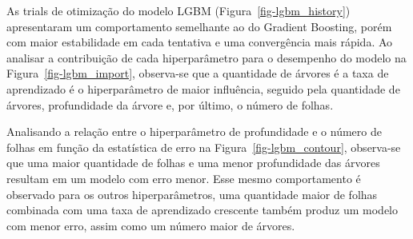 \documentclass[
  12pt,
  a4paper,
]{scrreprt}
\begin{document}
\vspace{12pt}

As trials de otimização do modelo LGBM (Figura~\ref{fig-lgbm_history})
apresentaram um comportamento semelhante ao do Gradient Boosting, porém
com maior estabilidade em cada tentativa e uma convergência mais rápida.
Ao analisar a contribuição de cada hiperparâmetro para o desempenho do
modelo na Figura~\ref{fig-lgbm_import}, observa-se que a quantidade de
árvores é a taxa de aprendizado é o hiperparâmetro de maior influência,
seguido pela quantidade de árvores, profundidade da árvore e, por
último, o número de folhas.

\vspace{12pt}

Analisando a relação entre o hiperparâmetro de profundidade e o número
de folhas em função da estatística de erro na
Figura~\ref{fig-lgbm_contour}, observa-se que uma maior quantidade de
folhas e uma menor profundidade das árvores resultam em um modelo com
erro menor. Esse mesmo comportamento é observado para os outros
hiperparâmetros, uma quantidade maior de folhas combinada com uma taxa
de aprendizado crescente também produz um modelo com menor erro, assim
como um número maior de árvores.
\end{document}
